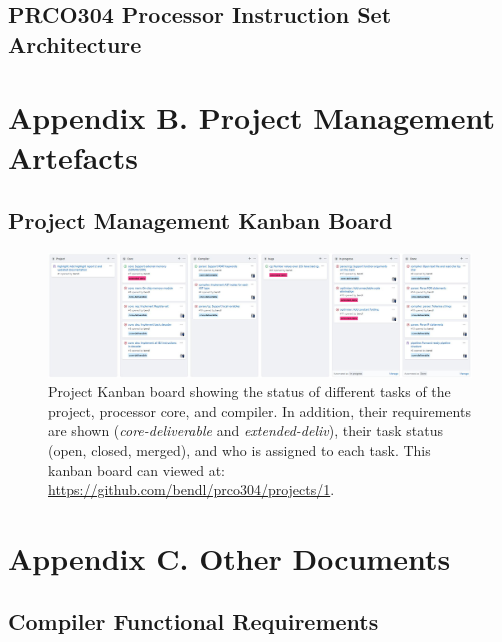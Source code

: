 \documentclass[11pt,a4paper]{report}
\newcommand{\scname}{PRCO304}
\begin{document}
\newpage
\subsection{\scname{} Processor Instruction Set Architecture}


\newpage
\section{Appendix B. Project Management Artefacts}


\newpage



\newpage
\begin{landscape}
\subsection{Project Management Kanban Board}
\begin{figure}[H]
\centering
\includegraphics[scale=0.55]{kanban2}
\caption{Project Kanban board showing the status of different tasks of the project, processor core, and compiler. In addition, their requirements are shown (\textit{core-deliverable} and \textit{extended-deliv}), their task status (open, closed, merged), and who is assigned to each task. This kanban board can viewed at: \url{https://github.com/bendl/prco304/projects/1}.}
\end{figure}
\end{landscape}


\newpage
\section{Appendix C. Other Documents}
\subsection{Compiler Functional Requirements}
\label{sect:compiler_func_req}
\end{document}
